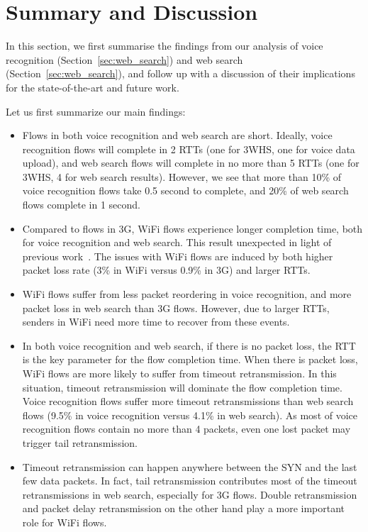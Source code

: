 
\section{Summary and Discussion}
\label{sec:discuss}

In this section, we first summarise the findings from our analysis of voice recognition (Section~\ref{sec:web_search}) and web search (Section~\ref{sec:web_search}), and follow up with a discussion of their implications for the state-of-the-art and future work.

Let us first summarize our main findings:

\begin{itemize}
	\item Flows in both voice recognition and web search are short. Ideally, voice recognition flows will complete in 2 RTTs (one for 3WHS, one for voice data upload), and web search flows will complete in no more than 5 RTTs (one for 3WHS, 4 for web search results). However, we see that more than 10\% of voice recognition flows take 0.5 second to complete, and 20\% of web search flows complete in 1 second.

	\item Compared to flows in 3G, WiFi flows experience longer completion time, both for voice recognition and web search. This result unexpected in light of previous work~\cite{deshpande2010performance,sommers2012cell}. The issues with WiFi flows are induced by both higher packet loss rate (3\% in WiFi versus 0.9\% in 3G) and larger RTTs.

	\item WiFi flows suffer from less packet reordering in voice recognition, and more packet loss in web search than 3G flows. However, due to larger RTTs, senders in WiFi need more time to recover from these events.

	\item In both voice recognition and web search, if there is no packet loss, the RTT is the key parameter for the flow completion time. When there is packet loss, WiFi flows are more likely to suffer from timeout retransmission. In this situation, timeout retransmission will dominate the flow completion time. Voice recognition flows suffer more timeout retransmissions than web search flows (9.5\% in voice recognition versus 4.1\% in web search). As most of voice recognition flows contain no more than 4 packets, even one lost packet may trigger tail retransmission. 

	\item Timeout retransmission can happen anywhere between the SYN and the last few data packets. In fact, tail retransmission contributes most of the timeout retransmissions in web search, especially for 3G flows. Double retransmission and packet delay retransmission on the other hand play a more important role for WiFi flows.
\end{itemize}

